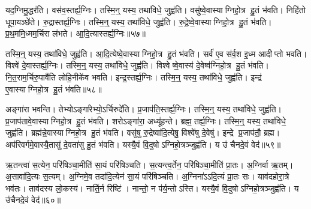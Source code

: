 यद॒ग्निमु॒द्धर॑ति। वस॑व॒स्तर्ह्य॒ग्निः। तस्मि॒न्॒ यस्य॒ तथा॑विधे॒ जुह्व॑ति। वसु॑ष्वे॒वास्याग्निहो॒त्र हु॒तं भ॑वति। निहि॑तो धूपा॒यञ्छे॑ते। रु॒द्रास्तर्ह्य॒ग्निः। तस्मि॒न्॒ यस्य॒ तथा॑विधे॒ जुह्व॑ति। रु॒द्रे॒ष्वे॒वास्याग्निहो॒त्र हु॒तं भ॑वति। प्र॒थ॒ममि॒ध्मम॒र्चिरा ल॑भते। आ॒दि॒त्यास्तर्ह्य॒ग्निः॥५७॥

तस्मि॒न्॒ यस्य॒ तथा॑विधे॒ जुह्व॑ति। आ॒दि॒त्येष्वे॒वास्याग्निहो॒त्र हु॒तं भ॑वति। सर्व॑ ए॒व स॑र्व॒श इ॒ध्म आदीप्तो भवति। विश्वे॑ दे॒वास्तर्ह्य॒ग्निः। तस्मि॒न्॒ यस्य॒ तथा॑विधे॒ जुह्व॑ति। विश्वेष्वे॒वास्य॑ दे॒वेष्व॑ग्निहो॒त्र हु॒तं भ॑वति। नि॒त॒राम॒र्चिरु॒पावै॑ति लोहि॒नीके॑व भवति। इन्द्र॒स्तर्ह्य॒ग्निः। तस्मि॒न्॒ यस्य॒ तथा॑विधे॒ जुह्व॑ति। इन्द्र॑ ए॒वास्याग्निहो॒त्र हु॒तं भ॑वति॥५८॥

अङ्गा॑रा भवन्ति। तेभ्योऽङ्गा॑रेभ्यो॒ऽर्चिरुदे॑ति। प्र॒जाप॑ति॒स्तर्ह्य॒ग्निः। तस्मि॒न्॒ यस्य॒ तथा॑विधे॒ जुह्व॑ति। प्र॒जाप॑तावे॒वास्याग्निहो॒त्र हु॒तं भ॑वति। शरोऽङ्गा॑रा॒ अध्यू॑हन्ते। ब्रह्म॒ तर्ह्य॒ग्निः। तस्मि॒न्॒ यस्य॒ तथा॑विधे॒ जुह्व॑ति। ब्रह्म॑न्ने॒वास्याग्निहो॒त्र हु॒तं भ॑वति। वसु॑षु रु॒द्रेष्वा॑दि॒त्येषु॒ विश्वे॑षु दे॒वेषु॑। इन्द्रे प्र॒जाप॑तौ॒ ब्रह्म\sn{}। अप॑रिवर्गमे॒वास्यै॒तासु॑ दे॒वता॑सु हु॒तं भ॑वति। यस्यै॒वं वि॒दुषोऽग्निहो॒त्रञ्जुह्व॑ति। य उ॑ चैनदे॒वं वेद॑॥५९॥\anuvakamend[आ॒दि॒त्यास्तर्ह्य॒ग्निरिन्द्र॑ ए॒वास्याग्निहो॒त्र हु॒तं भ॑वति दे॒वेषु॑ च॒त्वारि॑ च (यद॒ग्निन्निहि॑तः प्रथ॒म सर्व॑ ए॒व नि॑त॒रामङ्गा॑रा॒ शरोऽङ्गा॑रा॒ ब्रह्म॒ वसु॑ष्व॒ष्टौ ॥ )]

ऋ॒तन्त्वा॑ स॒त्येन॒ परि॑षिञ्चा॒मीति॑ सा॒यं परि॑षिञ्चति। स॒त्यन्त्व॒र्तेन॒ परि॑षिञ्चा॒मीति॑ प्रा॒तः। अ॒ग्निर्वा ऋ॒तम्। अ॒सावा॑दि॒त्यः स॒त्यम्। अ॒ग्निमे॒व तदा॑दि॒त्येन॑ सा॒यं परि॑षिञ्चति। अ॒ग्निना॑ऽऽदि॒त्यं प्रा॒तः सः। याव॑दहोरा॒त्रे भव॑तः। ताव॑दस्य लो॒कस्य॑। नार्ति॒र्न रिष्टि॑। नान्तो॒ न प॑र्य॒न्तोऽस्ति। यस्यै॒वं वि॒दुषोऽग्निहो॒त्रञ्जुह्व॑ति। य उ॑चैनदे॒वं वेद॑॥६०॥



